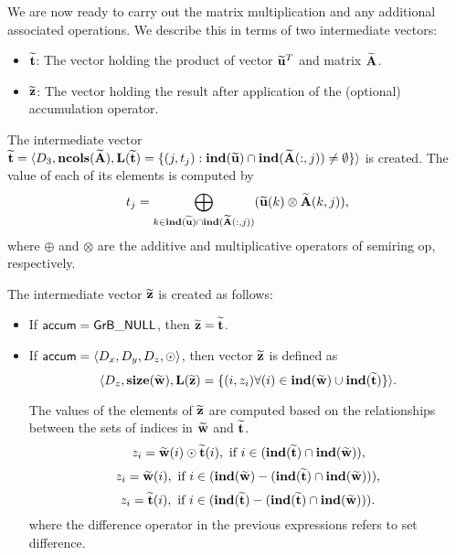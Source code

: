 We are now ready to carry out the matrix multiplication and any additional 
associated operations.  We describe this in terms of two intermediate vectors:
\begin{itemize}
	\item ${\bf \widetilde{t}}$: The vector holding the product of vector
    ${\bf \widetilde{u}}^T$ and matrix ${\bf \widetilde{A}}$.
	\item ${\bf \widetilde{z}}$: The vector holding the result after 
    application of the (optional) accumulation operator.
\end{itemize}

The intermediate vector ${\bf \widetilde{t}} = \langle
D_3, \bold{ncols}({\bf \widetilde{A}}),
\bold{L}({\bf \widetilde{t}}) =
\{(j,t_j) : \bold{ind}({\bf \widetilde{u}}) \cap
\bold{ind}({\bf \widetilde{A}}(:,j)) \neq \emptyset \} \rangle$
is created.  The value of each of its elements is computed by \[t_j
= \bigoplus_{k \in \bold{ind}({\bf \widetilde{u}}) \cap
\bold{ind}({\bf \widetilde{A}}(:,j))} ({\bf \widetilde{u}}(k)
\otimes {\bf \widetilde{A}}(k,j)),\] where $\oplus$ and $\otimes$
are the additive and multiplicative operators of semiring {\sf op},
respectively.

The intermediate vector ${\bf \widetilde{z}}$ is created as follows:
\begin{itemize}
    \item If ${\sf accum} = {\sf GrB\_NULL}$, then ${\bf \widetilde{z}} = {\bf \widetilde{t}}$. 
    
    \item If ${\sf accum} = \langle D_x, D_y, D_z, \odot \rangle$, then vector ${\bf \widetilde{z}}$ is defined as 
        \[ \langle D_z, \bold{size}({\bf \widetilde{w}}), 
        \bold{L}({\bf \widetilde{z}}) 
		= \{(i,z_{i})  \forall (i) \in \bold{ind}({\bf \widetilde{w}}) \cup 
        \bold{ind}({\bf \widetilde{t}}) \} \rangle.\]  

    The values of the elements of ${\bf \widetilde{z}}$ are computed based on the 
    relationships between the sets of indices in ${\bf \widetilde{w}}$ and 
    ${\bf \widetilde{t}}$.
\[
z_{i} = {\bf \widetilde{w}}(i) \odot {\bf \widetilde{t}}(i), \ \mbox{if}\  i \in  (\bold{ind}({\bf \widetilde{t}}) \cap \bold{ind}({\bf \widetilde{w}})),
\]
\[
z_{i} = \vector{\widetilde{w}}(i), \ \mbox{if}\  i \in  (\bold{ind}(\vector{\widetilde{w}}) - (\bold{ind}(\vector{\widetilde{t}}) \cap \bold{ind}(\vector{\widetilde{w}}))),
\]
\[
z_{i} = \vector{\widetilde{t}}(i), \ \mbox{if}\  i \in  (\bold{ind}(\vector{\widetilde{t}}) - (\bold{ind}(\vector{\widetilde{t}}) \cap \bold{ind}(\vector{\widetilde{w}}))).
\]
where the difference operator in the previous expressions refers to set difference.
\end{itemize}


